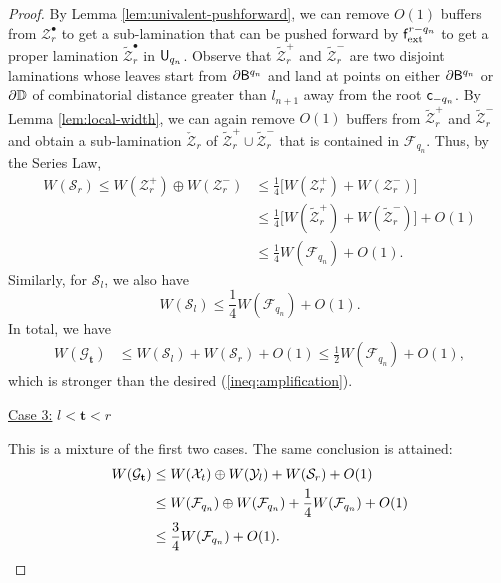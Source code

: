 \documentclass{amsart}
\begin{document}
\begin{proof}
    By Lemma \ref{lem:univalent-pushforward}, we can remove $O(1)$ buffers from $\mathcal{Z}^\bullet_r$ to get a sub-lamination that can be pushed forward by $\mathsf{f}_{\textnormal{ext}}^{r-q_{n}}$ to get a proper lamination $\tilde{\mathcal{Z}}^\bullet_r$ in $\mathsf{U}_{q_{n}}$. 
    Observe that $\tilde{\mathcal{Z}}^+_r$ and $\tilde{\mathcal{Z}}^-_r$ are two disjoint laminations whose leaves start from $\partial\mathsf{B}^{q_{n}}$ and land at points on either $\partial \mathsf{B}^{q_n}$ or $\partial \mathbb{D}$ of combinatorial distance greater than $l_{n+1}$ away from the root $\mathsf{c}_{-q_{n}}$. 
    By Lemma \ref{lem:local-width}, we can again remove $O(1)$ buffers
    from $\tilde{\mathcal{Z}}^+_r$ and $\tilde{\mathcal{Z}}^-_r$ and obtain a sub-lamination $\check{\mathcal{Z}}_r$ of $\tilde{\mathcal{Z}}^+_r \cup \tilde{\mathcal{Z}}^-_r$ that is contained in $\mathcal{F}_{q_n}$. 
    Thus, by the Series Law,
    \begin{align*}
        W(\mathcal{S}_r) \leq W(\mathcal{Z}^+_r) \oplus W(\mathcal{Z}^-_r)
        &\leq \frac{1}{4} \big[ W(\mathcal{Z}^+_r) + W(\mathcal{Z}^-_r) \big] \\
        &\leq \frac{1}{4} \big[ W(\tilde{\mathcal{Z}}^+_r) + W(\tilde{\mathcal{Z}}^-_r) \big] +O(1) \\
        &\leq \frac{1}{4} W(\mathcal{F}_{q_{n}}) + O(1).
    \end{align*}
    Similarly, for $\mathcal{S}_l$, we also have
    \[
        W(\mathcal{S}_l) \leq \frac{1}{4} W(\mathcal{F}_{q_{n}}) + O(1).
    \]
    In total, we have
    \begin{align*}
        W(\mathcal{G}_{\mathbf{t}}) &\leq W(\mathcal{S}_l) + W(\mathcal{S}_r) + O(1) \leq \frac{1}{2} W(\mathcal{F}_{q_{n}}) + O(1),
    \end{align*}  
    which is stronger than the desired (\ref{ineq:amplification}).
    \vspace{0.1in}

    \noindent \underline{Case 3:} $l < {\mathbf{t}} < r$
    \vspace{0.05in}

    This is a mixture of the first two cases. 
    The same conclusion is attained:
    \begin{align*}
        W(\mathcal{G}_{\mathbf{t}}) &\leq W(\mathcal{X}_t) \oplus W(\mathcal{Y}_l) + W(\mathcal{S}_r) + O(1) \\
        &\leq W(\mathcal{F}_{q_{n}}) \oplus W(\mathcal{F}_{q_{n}}) + \frac{1}{4} W(\mathcal{F}_{q_{n}}) + O(1) \\
        &\leq \frac{3}{4} W(\mathcal{F}_{q_{n}}) + O(1). \qedhere
    \end{align*}  
\end{proof}
\end{document}
